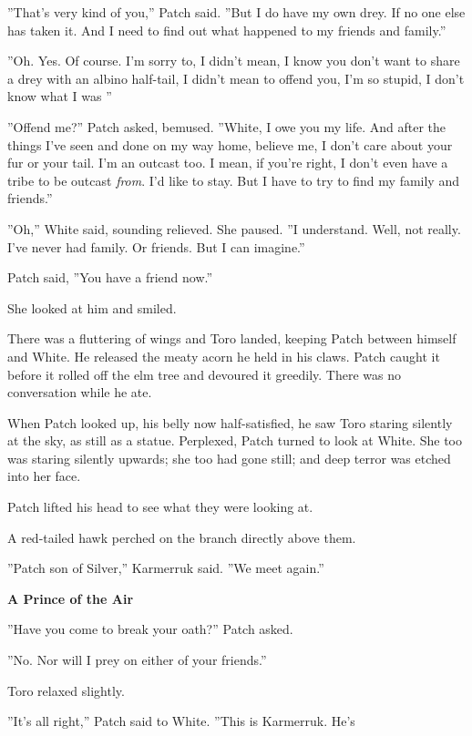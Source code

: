 \documentclass[11pt]{article}
\begin{document}
 ''That's very kind of you,'' Patch said. ''But I do have my own drey. If no one else has taken it. And I need to find out what happened to my friends and family.''\par
 ''Oh. Yes. Of course. I'm sorry to, I didn't mean, I know you don't want to share a drey with an albino half-tail, I didn't mean to offend you, I'm so stupid, I don't know what I was %
''\par
 ''Offend me?'' Patch asked, bemused. ''White, I owe you my life. And after the things I've seen and done on my way home, believe me, I don't care about your fur or your tail. I'm an outcast too. I mean, if you're right, I don't even have a tribe to be outcast {\it from}. I'd like to stay. But I have to try to find my family and friends.''\par
 ''Oh,'' White said, sounding relieved. She paused. ''I understand. Well, not really. I've never had family. Or friends. But I can imagine.''\par
 Patch said, ''You have a friend now.''\par
 She looked at him and smiled.\par
 There was a fluttering of wings and Toro landed, keeping Patch between himself and White. He released the meaty acorn he held in his claws. Patch caught it before it rolled off the elm tree and devoured it greedily. There was no conversation while he ate.\par
When Patch looked up, his belly now half-satisfied, he saw Toro staring silently at the sky, as still as a statue. Perplexed, Patch turned to look at White. She too was staring silently upwards; she too had gone still; and deep terror was etched into her face.\par
 Patch lifted his head to see what they were looking at.\par
 A red-tailed hawk perched on the branch directly above them.\par
 ''Patch son of Silver,'' Karmerruk said. ''We meet again.''\par
\par
{\bf A Prince of the Air\par
}\par
 ''Have you come to break your oath?'' Patch asked.\par
 ''No. Nor will I prey on either of your friends.''\par
 Toro relaxed slightly.\par
 ''It's all right,'' Patch said to White. ''This is Karmerruk. He's %
\end{document}

